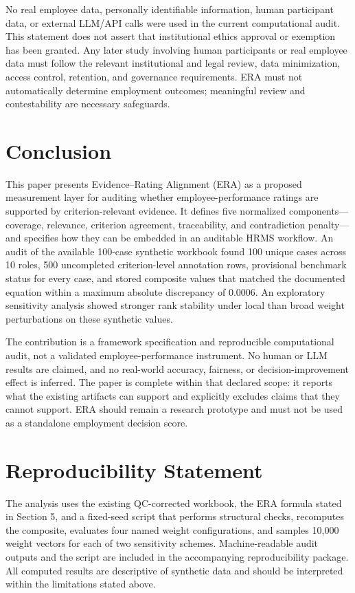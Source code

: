 \documentclass[
  10pt,
  runningheads]{llncs}
\begin{document}
No real employee data, personally identifiable information, human
participant data, or external LLM/API calls were used in the current
computational audit. This statement does not assert that institutional
ethics approval or exemption has been granted. Any later study involving
human participants or real employee data must follow the relevant
institutional and legal review, data minimization, access control,
retention, and governance requirements. ERA must not automatically
determine employment outcomes; meaningful review and contestability are
necessary safeguards.

\section{Conclusion}\label{conclusion}

This paper presents Evidence--Rating Alignment (ERA) as a proposed
measurement layer for auditing whether employee-performance ratings are
supported by criterion-relevant evidence. It defines five normalized
components---coverage, relevance, criterion agreement, traceability, and
contradiction penalty---and specifies how they can be embedded in an
auditable HRMS workflow. An audit of the available 100-case synthetic
workbook found 100 unique cases across 10 roles, 500 uncompleted
criterion-level annotation rows, provisional benchmark status for every
case, and stored composite values that matched the documented equation
within a maximum absolute discrepancy of 0.0006. An exploratory
sensitivity analysis showed stronger rank stability under local than
broad weight perturbations on these synthetic values.

The contribution is a framework specification and reproducible
computational audit, not a validated employee-performance instrument. No
human or LLM results are claimed, and no real-world accuracy, fairness,
or decision-improvement effect is inferred. The paper is complete within
that declared scope: it reports what the existing artifacts can support
and explicitly excludes claims that they cannot support. ERA should
remain a research prototype and must not be used as a standalone
employment decision score.

\section{Reproducibility Statement}\label{reproducibility-statement}

The analysis uses the existing QC-corrected workbook, the ERA formula
stated in Section 5, and a fixed-seed script that performs structural
checks, recomputes the composite, evaluates four named weight
configurations, and samples 10,000 weight vectors for each of two
sensitivity schemes. Machine-readable audit outputs and the script are
included in the accompanying reproducibility package. All computed
results are descriptive of synthetic data and should be interpreted
within the limitations stated above.
\end{document}
